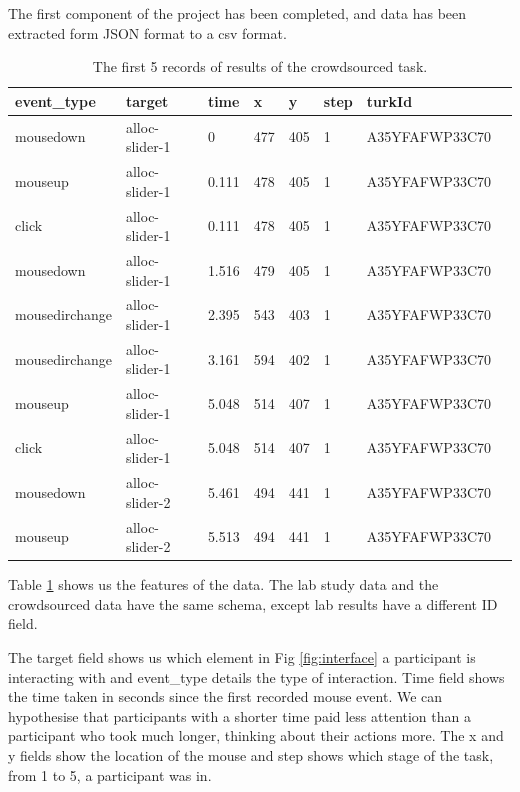 \documentclass{article}
\begin{document}


The first component of the project has been completed, and data has been extracted form JSON format to a csv format.

\begin{table}[ht]
    \caption{\label{table:data} The first 5 records of results of the crowdsourced task.}

    \begin{tabular}{llllllll}
        \hline
        event\_type    & target         & time  & x   & y   & step & turkId         \\ \hline
        mousedown      & alloc-slider-1 & 0     & 477 & 405 & 1    & A35YFAFWP33C70 \\
        mouseup        & alloc-slider-1 & 0.111 & 478 & 405 & 1    & A35YFAFWP33C70 \\
        click          & alloc-slider-1 & 0.111 & 478 & 405 & 1    & A35YFAFWP33C70 \\
        mousedown      & alloc-slider-1 & 1.516 & 479 & 405 & 1    & A35YFAFWP33C70 \\
        mousedirchange & alloc-slider-1 & 2.395 & 543 & 403 & 1    & A35YFAFWP33C70 \\
        mousedirchange & alloc-slider-1 & 3.161 & 594 & 402 & 1    & A35YFAFWP33C70 \\
        mouseup        & alloc-slider-1 & 5.048 & 514 & 407 & 1    & A35YFAFWP33C70 \\
        click          & alloc-slider-1 & 5.048 & 514 & 407 & 1    & A35YFAFWP33C70 \\
        mousedown      & alloc-slider-2 & 5.461 & 494 & 441 & 1    & A35YFAFWP33C70 \\
        mouseup        & alloc-slider-2 & 5.513 & 494 & 441 & 1    & A35YFAFWP33C70 \\ \hline
    \end{tabular}
\end{table}

Table \ref{table:data} shows us the features of the data.
The lab study data and the crowdsourced data have the same schema, except lab results have a different ID field.

The target field shows us which element in Fig \ref{fig:interface} a participant is interacting with and event\_type details the type of interaction.
Time field shows the time taken in seconds since the first recorded mouse event.
We can hypothesise that participants with a shorter time paid less attention than a participant who took much longer, thinking about their actions more.
The x and y fields show the location of the mouse and step shows which stage of the task, from 1 to 5, a participant was in.
\end{document}

